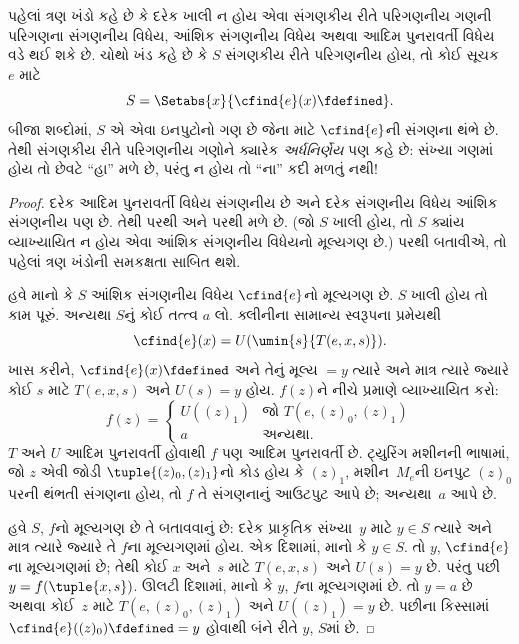 \begin{explain}
પહેલાં ત્રણ ખંડો કહે છે કે દરેક ખાલી ન હોય એવા સંગણકીય રીતે
પરિગણનીય ગણની પરિગણના સંગણનીય વિધેય, આંશિક સંગણનીય વિધેય
અથવા આદિમ પુનરાવર્તી વિધેય વડે થઈ શકે છે. ચોથો ખંડ કહે છે કે
$S$ સંગણકીય રીતે પરિગણનીય હોય, તો કોઈ સૂચક~$e$ માટે
\[
S = \Setabs{x}{\cfind{e}(x) \fdefined}.
\]
બીજા શબ્દોમાં, $S$ એ એવા ઇનપુટોનો ગણ છે જેના માટે
$\cfind{e}$ની સંગણના થંભે છે. તેથી સંગણકીય રીતે પરિગણનીય
ગણોને ક્યારેક \emph{અર્ધનિર્ણેય} પણ કહે છે: સંખ્યા ગણમાં હોય
તો છેવટે ``હા'' મળે છે, પરંતુ ન હોય તો ``ના'' કદી મળતું નથી!{}
\end{explain}

\begin{proof}
દરેક આદિમ પુનરાવર્તી વિધેય સંગણનીય છે અને દરેક સંગણનીય વિધેય
આંશિક સંગણનીય પણ છે. તેથી  પરથી
 અને  પરથી
 મળે છે. (જો $S$ ખાલી હોય, તો $S$ ક્યાંય
વ્યાખ્યાયિત ન હોય એવા આંશિક સંગણનીય વિધેયનો મૂલ્યગણ છે.)
 પરથી  બતાવીએ,
તો પહેલાં ત્રણ ખંડોની સમકક્ષતા સાબિત થશે.

હવે માનો કે $S$ આંશિક સંગણનીય વિધેય $\cfind{e}$નો મૂલ્યગણ
છે. $S$ ખાલી હોય તો કામ પૂરું. અન્યથા $S$નું કોઈ તત્ત્વ $a$
લો. ક્લીનીના સામાન્ય સ્વરૂપના પ્રમેયથી
\[
\cfind{e}(x) = U(\umin{s}{T(e, x, s)}).
\]
ખાસ કરીને, $\cfind{e}(x) \fdefined$ અને તેનું મૂલ્ય $= y$
ત્યારે અને માત્ર ત્યારે જ્યારે કોઈ $s$ માટે $T(e, x, s)$
અને $U(s) = y$ હોય. $f(z)$ને નીચે પ્રમાણે વ્યાખ્યાયિત કરો:
\[
f(z) = \begin{cases}
  U((z)_1) & \text{જો $T(e, (z)_0, (z)_1)$} \\
  a        & \text{અન્યથા.}
\end{cases}
\]
$T$ અને $U$ આદિમ પુનરાવર્તી હોવાથી $f$ પણ આદિમ પુનરાવર્તી
છે. ટ્યુરિંગ મશીનની ભાષામાં, જો $z$ એવી
  જોડી $\tuple{(z)_0, (z)_1}$નો કોડ હોય કે $(z)_1$,
  મશીન~$M_e$ની ઇનપુટ $(z)_0$ પરની થંભતી સંગણના હોય,
  તો $f$ તે સંગણનાનું આઉટપુટ આપે છે; અન્યથા~$a$ આપે છે.

હવે $S$, $f$નો મૂલ્યગણ છે તે બતાવવાનું છે: દરેક પ્રાકૃતિક
સંખ્યા~$y$ માટે $y \in S$ ત્યારે અને માત્ર ત્યારે જ્યારે
તે $f$ના મૂલ્યગણમાં હોય. એક દિશામાં, માનો કે $y \in S$.
તો $y$, $\cfind{e}$ના મૂલ્યગણમાં છે; તેથી કોઈ $x$ અને~$s$
માટે $T(e,x,s)$ અને $U(s) = y$ છે. પરંતુ પછી
$y = f(\tuple{x,s})$. ઊલટી દિશામાં, માનો કે $y$, $f$ના
મૂલ્યગણમાં છે. તો $y = a$ છે અથવા કોઈ~$z$ માટે
$T(e,(z)_0,(z)_1)$ અને $U((z)_1) = y$ છે. પછીના કિસ્સામાં
$\cfind{e}((z)_0) \fdefined = y$ હોવાથી બંને રીતે $y$,
$S$માં છે.


\end{proof}
